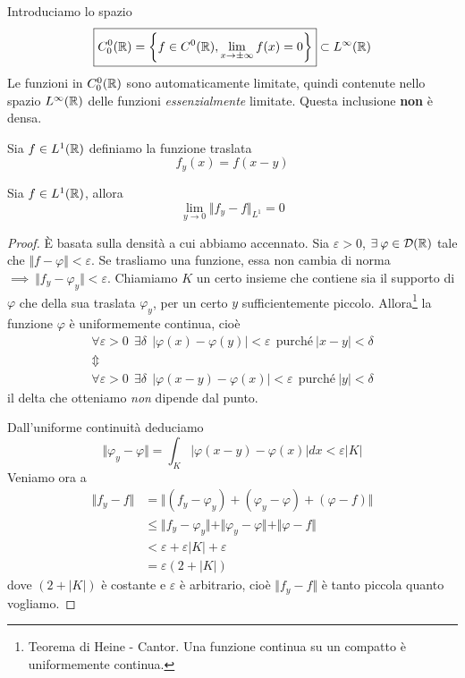 Introduciamo lo spazio
\begin{equation*}
\boxed{C^{0}_{0}(\mathbb{R}) = \left\{f\in C^{0}(\mathbb{R}), \lim_{x\rightarrow \pm \infty} f(x) = 0\right\}} \subset L^{\infty}(\mathbb{R})
\end{equation*}
Le funzioni in $C^{0}_{0}(\mathbb{R})$ sono automaticamente limitate, quindi contenute nello spazio $L^{\infty}(\mathbb{R})$ delle funzioni \textit{essenzialmente} limitate. Questa inclusione \textbf{non} è densa.

Sia $f\in L^{1}(\mathbb{R})$ definiamo la funzione traslata
\begin{equation*}
f_{y}(x) = f(x - y)
\end{equation*}
\begin{thm}
Sia $f\in L^{1}(\mathbb{R})$, allora
\begin{equation*}
\lim\limits_{y\rightarrow 0} \Vert f_{y} - f \Vert_{L^{1}} = 0
\end{equation*}
\end{thm}
\begin{proof}

È basata sulla densità a cui abbiamo accennato. Sia $\varepsilon > 0$, $\exists \varphi \in \Dc(\RR)$ tale che $ \Vert f - \varphi \Vert < \varepsilon $. Se trasliamo una funzione, essa non cambia di norma $\implies \ \Vert f_{y} - \varphi_{y} \Vert < \varepsilon $. Chiamiamo $K$ un certo insieme che contiene sia il supporto di $\varphi $ che della sua traslata $\varphi_{y}$, per un certo $y$ sufficientemente piccolo. Allora\footnote{Teorema di Heine - Cantor. Una funzione continua su un compatto è uniformemente continua.} la funzione $\varphi $ è uniformemente continua, cioè
\begin{gather*}
\forall \varepsilon > 0\ \ \exists \delta \ \ | \varphi (x) - \varphi (y)| < \varepsilon \ \ \text{purché} \ | x - y| < \delta \\
\Updownarrow \\
\forall \varepsilon > 0\ \ \exists \delta \ \ | \varphi (x - y) - \varphi (x)| < \varepsilon \ \ \text{purché} \ | y| < \delta
\end{gather*}
il delta che otteniamo \textit{non} dipende dal punto.

Dall'uniforme continuità deduciamo
\begin{equation*}
\Vert \varphi_{y} - \varphi \Vert = \int_{K}| \varphi (x - y) - \varphi (x)| dx < \varepsilon | K|
\end{equation*}
Veniamo ora a
\begin{align*}
\Vert f_{y} - f \Vert & = \Vert (f_{y} - \varphi_{y}) + (\varphi_{y} - \varphi) + (\varphi - f) \Vert \\
 & \leq \Vert f_{y} - \varphi_{y} \Vert + \Vert \varphi_{y} - \varphi \Vert + \Vert \varphi - f \Vert \\
 & < \varepsilon + \varepsilon | K| + \varepsilon \\
 & = \varepsilon (2 + | K|)
\end{align*}
dove $(2 + | K|)$ è costante e $\varepsilon $ è arbitrario, cioè $ \Vert f_{y} - f \Vert $ è tanto piccola quanto vogliamo.
\end{proof}

